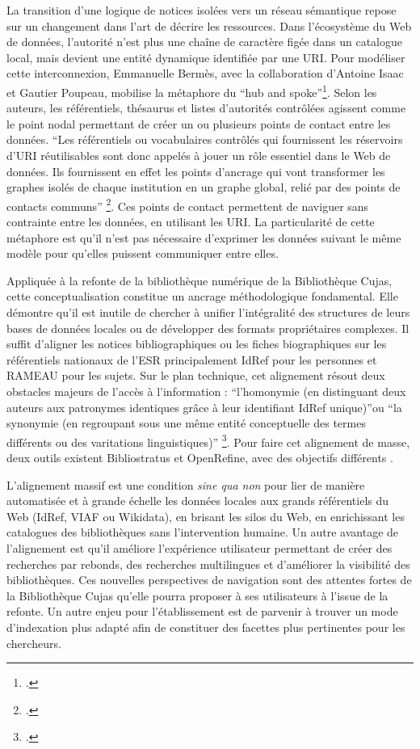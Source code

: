 La transition d'une logique de notices isolées vers un réseau sémantique repose sur un changement dans l'art de décrire les ressources. Dans l'écosystème du Web de données, l'autorité n'est plus une chaîne de caractère figée dans un catalogue local, mais devient une entité dynamique identifiée par une \ac{URI}. Pour modéliser cette interconnexion, Emmanuelle Bermès, avec la collaboration d'Antoine Isaac et Gautier Poupeau, mobilise la métaphore du \enquote{hub and spoke}\footcite{bermesWebSemantiqueBibliotheque2013}. Selon les auteurs, les référentiels, thésaurus et listes d'autorités contrôlées agissent comme le point nodal permettant de créer un ou plusieurs points de contact entre les données. \enquote{Les référentiels ou vocabulaires contrôlés qui fournissent les réservoirs d’\ac{URI} réutilisables sont donc appelés à jouer un rôle essentiel dans le Web de données. Ils fournissent en effet les points d’ancrage qui vont transformer les graphes isolés de chaque institution en un graphe global, relié par des points de contacts communs} \footcite{bermesWebSemantiqueBibliotheque2013}. Ces points de contact permettent de naviguer sans contrainte entre les données, en utilisant les \ac{URI}. La particularité de cette métaphore est qu'il n'est pas nécessaire d'exprimer les données suivant le même modèle pour qu'elles puissent communiquer entre elles.

Appliquée à la refonte de la bibliothèque numérique de la Bibliothèque Cujas, cette conceptualisation constitue un ancrage méthodologique fondamental. Elle démontre qu'il est inutile de chercher à unifier l'intégralité des structures de leurs bases de données locales ou de développer des formats propriétaires complexes. Il suffit d'aligner les notices bibliographiques ou les fiches biographiques sur les référentiels nationaux de l'\ac{ESR} principalement IdRef pour les personnes et \ac{RAMEAU} pour les sujets. Sur le plan technique, cet alignement résout deux obstacles majeurs de l'accès à l'information : \enquote{l'homonymie (en distinguant deux auteurs aux patronymes identiques grâce à leur identifiant IdRef unique)}ou \enquote{la synonymie (en regroupant sous une même entité conceptuelle des termes différents ou des varitations linguistiques)} \footcite{PlateformeIdRefReseau}. Pour faire cet alignement de masse, deux outils existent Bibliostratus  et OpenRefine, avec des objectifs différents . 

L'alignement massif est une condition \textit{sine qua non} pour lier de manière automatisée et à grande échelle les données locales aux grands référentiels du Web (IdRef, \ac{VIAF} ou Wikidata), en brisant les silos du Web, en enrichissant les catalogues des bibliothèques sans l'intervention humaine. Un autre avantage de l'alignement est qu'il améliore l'expérience utilisateur permettant de créer des recherches par rebonds, des recherches multilingues et d'améliorer la visibilité des bibliothèques. Ces nouvelles perspectives de navigation sont des attentes fortes de la Bibliothèque Cujas qu'elle pourra proposer à ses utilisateurs à l'issue de la refonte. Un autre enjeu pour l'établissement est de parvenir à trouver un mode d'indexation plus adapté afin de constituer des facettes plus pertinentes pour les chercheurs.

